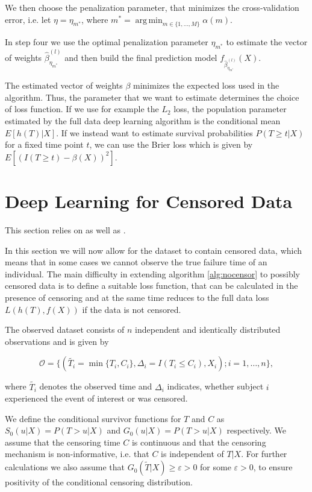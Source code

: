 \documentclass[12pt, a4paper]{article}
\theoremstyle{definition}
\theoremstyle{plain}
\numberwithin{equation}{section}
\numberwithin{figure}{section}
\numberwithin{table}{section}
\DeclareMathOperator*{\argmin}{arg\,min}
\begin{document}
 	We then choose the penalization parameter, that minimizes the cross-validation error, i.e. let $\eta = \eta_{m^*}$, where $m^* = \argmin_{m \in \{1,\dots,M\}} \alpha(m)$.
 	
 	In step four we use the optimal penalization parameter $\eta_{m^*}$ to estimate the vector of weights $\hat{\beta}_{\eta_{m^*}}^{(l)}$ and then build the final prediction model $f_{\hat{\beta}_{\eta_{m^*}}^{(l)}}(X)$.
 	
 	The estimated vector of weights $\beta$ minimizes the expected loss used in the algorithm.
 	Thus, the parameter that we want to estimate determines the choice of loss function.
 	If we use for example the $L_2$ loss, the population parameter estimated by the full data deep learning algorithm is the conditional mean $E[h(T) \vert X]$.
 	If we instead want to estimate survival probabilities $P(T\geq t \vert X )$ for a fixed time point $t$, we can use the Brier loss which is given by $E[(I(T\geq t)-\beta(X))^2]$.
 	
	\newpage
	\section{Deep Learning for Censored Data} \label{censored}
	
	This section relies on \citet*{basearticle} as well as \citet*{deeplbook}.
	
	In this section we will now allow for the dataset to contain censored data, which means that in some cases we cannot observe the true failure time of an individual.
	The main difficulty in extending algorithm \ref{alg:nocensor} to possibly censored data is to define a suitable loss function, that can be calculated in the presence of censoring and at the same time reduces to the full data loss $L(h(T), f(X))$ if the data is not censored.
	
	The observed dataset consists of $n$ independent and identically distributed observations and is given by 
	
	\begin{equation*}
	\mathcal{O} = \{(\tilde{T_i} = \min \{T_i, C_i\}, \Delta_i = I(T_i \leq C_i), X_i); i = 1,\dots,n\},
	\end{equation*}
	 
	 where $\tilde{T_i}$ denotes the observed time and $\Delta_i$ indicates, whether subject $i$ experienced the event of interest or was censored.
	 
	 We define the conditional survivor functions for $T$ and $C$ as $S_0(u \vert X)=P(T>u \vert X)$ and $G_0(u \vert X)=P(T>u \vert X)$ respectively.
	 We assume that the censoring time $C$ is continuous and that the censoring mechanism is non-informative, i.e. that $C$ is independent of $T\vert X$.
	 For further calculations we also assume that $G_0(\tilde{T} \vert X)\geq \varepsilon > 0$ for some $\varepsilon >0$, to ensure positivity of the conditional censoring distribution.
	
\end{document}
